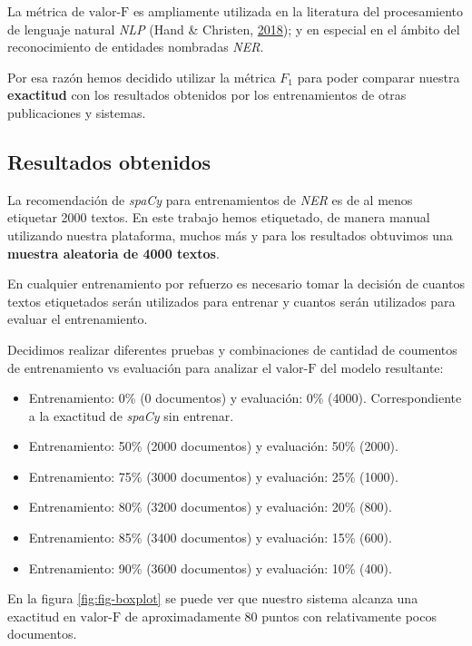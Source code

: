 \documentclass[12pt,a4paper,]{scrartcl}
\providecommand{\tightlist}{%
  \setlength{\itemsep}{0pt}\setlength{\parskip}{0pt}}
\begin{document}
La métrica de \(\text{valor-F}\) es ampliamente utilizada en la literatura del procesamiento de lenguaje natural \emph{NLP} (Hand \& Christen, \protect\hyperlink{ref-pub_1084928040}{2018}); y en especial en el ámbito del reconocimiento de entidades nombradas \emph{NER}.

Por esa razón hemos decidido utilizar la métrica \(F_1\) para poder comparar nuestra \textbf{exactitud} con los resultados obtenidos por los entrenamientos de otras publicaciones y sistemas.

\hypertarget{result-data}{%
\subsection{Resultados obtenidos}\label{result-data}}

La recomendación de \emph{spaCy} para entrenamientos de \emph{NER} es de al menos etiquetar 2000 textos. En este trabajo hemos etiquetado, de manera manual utilizando nuestra plataforma, muchos más y para los resultados obtuvimos una \textbf{muestra aleatoria de 4000 textos}.

En cualquier entrenamiento por refuerzo es necesario tomar la decisión de cuantos textos etiquetados serán utilizados para entrenar y cuantos serán utilizados para evaluar el entrenamiento.

Decidimos realizar diferentes pruebas y combinaciones de cantidad de coumentos de entrenamiento vs evaluación para analizar el \(\text{valor-F}\) del modelo resultante:

\begin{itemize}
\tightlist
\item
  Entrenamiento: 0\% (0 documentos) y evaluación: 0\% (4000). Correspondiente a la exactitud de \emph{spaCy} sin entrenar.
\item
  Entrenamiento: 50\% (2000 documentos) y evaluación: 50\% (2000).
\item
  Entrenamiento: 75\% (3000 documentos) y evaluación: 25\% (1000).
\item
  Entrenamiento: 80\% (3200 documentos) y evaluación: 20\% (800).
\item
  Entrenamiento: 85\% (3400 documentos) y evaluación: 15\% (600).
\item
  Entrenamiento: 90\% (3600 documentos) y evaluación: 10\% (400).
\end{itemize}

En la figura \ref{fig:fig-boxplot} se puede ver que nuestro sistema alcanza una exactitud en \(\text{valor-F}\) de aproximadamente 80 puntos con relativamente pocos documentos.
\end{document}
